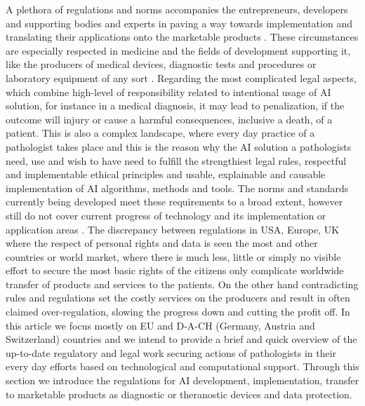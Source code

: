 A plethora of regulations and norms accompanies the entrepreneurs, developers and supporting bodies and experts in paving a way towards implementation and translating their applications onto the marketable products \cite{DIN_DKE_Roadmap}. These circumstances are especially respected in medicine and the fields of development supporting it, like the producers of medical devices, diagnostic tests and procedures or laboratory equipment of any sort \cite{DIN_SPEC_13266} \cite{DIN_SPEC_13288}. Regarding the most complicated legal aspects, which combine high-level of responsibility related to intentional usage of AI solution, for instance in a medical diagnosis, it may lead to penalization, if the outcome will injury or cause a harmful consequences, inclusive a death, of a patient. This is also a complex landscape, where every day practice of a pathologist takes place and this is the reason why the AI solution a pathologists need, use and wish to have need to fulfill the strengthiest legal rules, respectful and implementable ethical principles and usable\cite{ISO_IEC_25010}, explainable \cite{arrieta2020explainable} \cite{HudecEtAl-2021-Interpretable} \cite{tjoa_survey_2020} and causable \cite{HolzingerEtAl:2020:QualityOfExplanations} implementation of AI algorithms, methods and tools.
The norms and standards currently being developed \cite{EU_White} \cite{ISO_IEC_TR_29119-11} \cite{ISO_IEC_TR_24028} \cite{ISO_IEC_TR_24029-1} meet these requirements to a broad extent, however still do not cover current progress of technology and its implementation or application areas \cite{DIN_SPEC_92001-1} \cite{DIN_SPEC_92001-2}. The discrepancy between regulations in USA, Europe, UK where the respect of personal rights and data is seen the most and other countries or world market, where there is much less, little or simply no visible effort to secure the most basic rights of the citizens only complicate worldwide transfer of products and services to the patients. On the other hand contradicting rules and regulations set the costly services on the producers and result in often claimed over-regulation, slowing the progress down and cutting the profit off. 
In this article we focus mostly on EU and D-A-CH (Germany, Austria and Switzerland) countries and we intend to provide a brief and quick overview of the up-to-date regulatory and legal work securing actions of pathologists in their every day efforts based on technological and computational support. Through this section we introduce the regulations for AI development, implementation, transfer to marketable products as diagnostic or theranostic devices and data protection.


